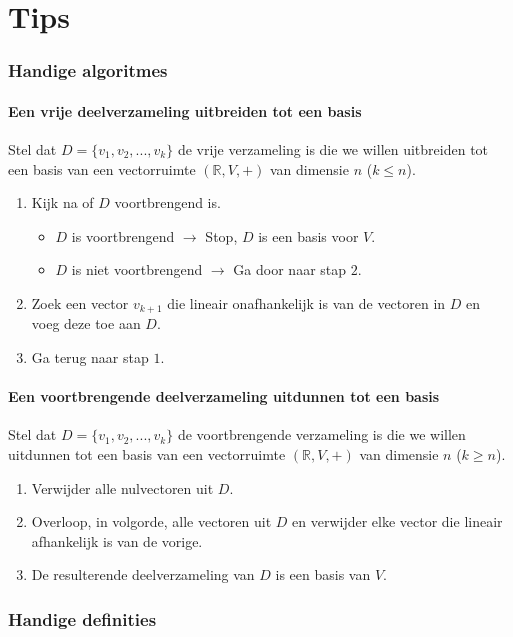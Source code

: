 \documentclass[lineaire_algebra_oplossingen.tex]{subfiles}
\begin{document}
\newpage
\part{Tips}
\section{Handige algoritmes}
\subsection{Een vrije deelverzameling uitbreiden tot een basis}
Stel dat $D = \{v_1,v_2,...,v_k\}$ de vrije verzameling is die we willen uitbreiden tot een basis van een vectorruimte $(\mathbb{R},V,+)$ van dimensie $n$ ($k\le n$).
\begin{enumerate}
\item Kijk na of $D$ voortbrengend is.
\begin{itemize}
\item $D$ is voortbrengend $\rightarrow$ Stop, $D$ is een  basis voor $V$.
\item $D$ is niet voortbrengend $\rightarrow$ Ga door naar stap $2$.
\end{itemize}
\item Zoek een vector $v_{k+1}$ die lineair onafhankelijk is van de vectoren in $D$ en voeg deze toe aan $D$.
\item Ga terug naar stap $1$.
\end{enumerate}
\subsection{Een voortbrengende deelverzameling uitdunnen tot een basis}
Stel dat $D = \{v_1,v_2,...,v_k\}$ de voortbrengende verzameling is die we willen uitdunnen tot een basis van een vectorruimte $(\mathbb{R},V,+)$ van dimensie $n$ ($k\ge n$).
\begin{enumerate}
\item Verwijder alle nulvectoren uit $D$.
\item Overloop, in volgorde, alle vectoren uit $D$ en verwijder elke vector die lineair afhankelijk is van de vorige.
\item De resulterende deelverzameling van $D$ is een basis van $V$.
\end{enumerate}

\section{Handige definities}
\end{document}
